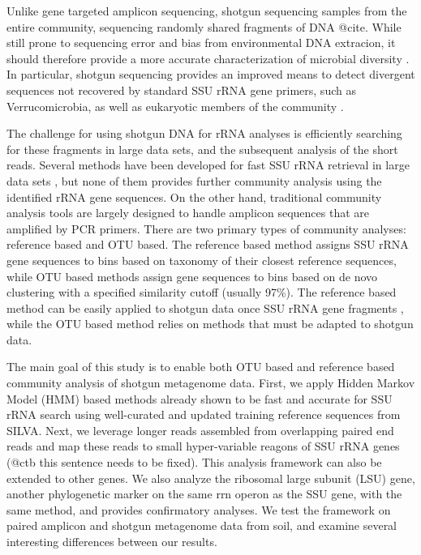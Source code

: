 \documentclass[12pt]{article}
\begin{document}
Unlike gene targeted amplicon sequencing, shotgun sequencing samples
from the entire community, sequencing randomly shared fragments of DNA
@cite.  While still prone to sequencing error and bias from
environmental DNA extracion, it should therefore provide a more
accurate characterization of microbial diversity \cite{chimeraslayer}.
In particular, shotgun sequencing provides an improved means to detect
divergent sequences not recovered by standard SSU rRNA gene primers,
such as Verrucomicrobia, as well as eukaryotic members of the
community \cite{baker2003,primereva2008,verruco2011}.

The challenge for using shotgun DNA for rRNA analyses is 
efficiently searching for these fragments in large data sets,
and the subsequent analysis of the short reads.
Several methods have been
developed for fast SSU rRNA retrieval in large data sets
\cite{ribopicker,metarna,rrnaselector,metaxa}, but none of them
provides further community analysis using the identified rRNA gene
sequences.  On the other hand,
traditional community analysis tools \cite{rdp2009,mothur,qiime} are
largely designed to handle amplicon sequences that are amplified by PCR
primers. There are two primary types of community analyses:
reference based and OTU based. The reference based method assigns SSU
rRNA gene sequences to bins based on taxonomy of their closest reference
sequences, while OTU based methods assign gene sequences to bins based on
de novo clustering with a specified similarity cutoff (usually 97\%). The
reference based method can be easily applied to shotgun data once SSU
rRNA gene fragments \cite{rdpclassifier}, while the OTU based method
relies on methods that must be adapted to shotgun data.

The main goal of this study is to enable both OTU based and reference
based community analysis of shotgun metagenome data. First, we apply
Hidden Markov Model (HMM) based methods already shown to be fast and
accurate for SSU rRNA search \cite{metarna,rrnaselector,metaxa} using
well-curated and updated training reference sequences from
SILVA. Next, we leverage longer reads assembled from overlapping
paired end reads and map these reads to small hyper-variable reagons
of SSU rRNA genes (@ctb this sentence needs to be fixed).  This
analysis framework can also be extended to other genes. We also
analyze the ribosomal large subunit (LSU) gene, another phylogenetic
marker on the same rrn operon as the SSU gene, with the same method,
and provides confirmatory analyses. We test the framework on paired
amplicon and shotgun metagenome data from soil,
and examine several interesting differences between our results.
\end{document}
